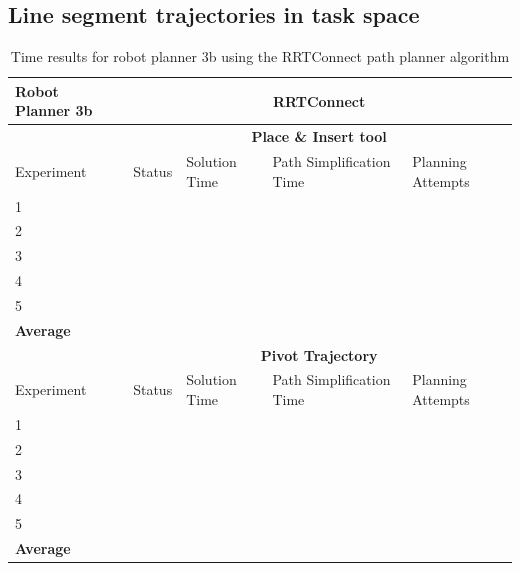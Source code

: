 \subsection{Line segment trajectories in task space}

\begin{table}[H]
\centering
\begin{tabular}{|p{2cm}|c|p{3cm}|p{3cm}|p{3cm}|}
\hline
Robot Planner 3b           & \multicolumn{4}{c}{\textbf{RRTConnect}}                                                                                                 \vline \\
\hline
                          & \multicolumn{4}{c}{\textbf{Place \& Insert tool}}                     \vline \\
\hline
Experiment                & Status & Solution Time & Path Simplification Time & Planning Attempts  \\
\hline
1                         &        &               &                          &  \\
2                         &        &               &                          &  \\
3                         &        &               &                          &  \\
4                         &        &               &                          &  \\
5                         &        &               &                          &  \\
\hline
\textbf{Average} & 	& 	& 	&  \\
\hline
                          & \multicolumn{4}{c}{\textbf{Pivot Trajectory}}                     \vline \\
\hline
Experiment                & Status & Solution Time & Path Simplification Time & Planning Attempts  \\
\hline
1                         &        &               &                          &  \\
2                         &        &               &                          &  \\
3                         &        &               &                          &  \\
4                         &        &               &                          &  \\
5                         &        &               &                          &  \\
\hline
\textbf{Average} & 	& 	& 	&  \\
\hline
\end{tabular}
\caption{Time results for robot planner 3b using the RRTConnect path planner algorithm}
\label{robot-planner3b-rrtconnect-data}
\end{table}


